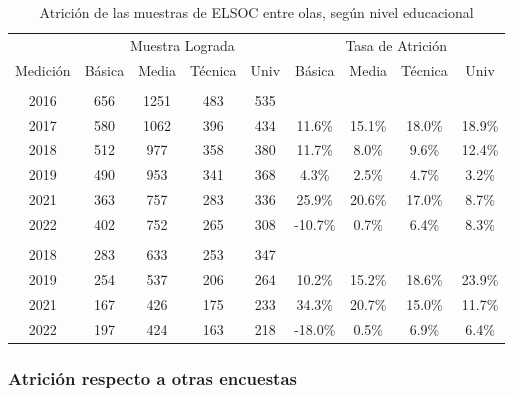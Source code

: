 \documentclass[
  12pt,
]{article}
\begin{document}
\begin{table}[H]

\caption{\label{tab:tabla-atricion-educ}Atrición de las muestras de ELSOC entre olas, según nivel educacional}
\centering
\begin{tabular}[t]{ccccccccc}
\toprule
\multicolumn{1}{c}{ } & \multicolumn{4}{c}{Muestra Lograda} & \multicolumn{4}{c}{Tasa de Atrición} \\
\cmidrule(l{3pt}r{3pt}){2-5} \cmidrule(l{3pt}r{3pt}){6-9}
Medición & Básica & Media & Técnica & Univ & Básica & Media & Técnica & Univ\\
\midrule
\addlinespace[0.3em]
\multicolumn{9}{l}{\textbf{Muestra Original}}\\
\hspace{1em}2016 & 656 & 1251 & 483 & 535 &  &  &  & \\
\hspace{1em}2017 & 580 & 1062 & 396 & 434 & 11.6\% & 15.1\% & 18.0\% & 18.9\%\\
\hspace{1em}2018 & 512 & 977 & 358 & 380 & 11.7\% & 8.0\% & 9.6\% & 12.4\%\\
\hspace{1em}2019 & 490 & 953 & 341 & 368 & 4.3\% & 2.5\% & 4.7\% & 3.2\%\\
\hspace{1em}2021 & 363 & 757 & 283 & 336 & 25.9\% & 20.6\% & 17.0\% & 8.7\%\\
\hspace{1em}2022 & 402 & 752 & 265 & 308 & -10.7\% & 0.7\% & 6.4\% & 8.3\%\\
\addlinespace[0.3em]
\multicolumn{9}{l}{\textbf{Muestra Refresco}}\\
\hspace{1em}2018 & 283 & 633 & 253 & 347 &  &  &  & \\
\hspace{1em}2019 & 254 & 537 & 206 & 264 & 10.2\% & 15.2\% & 18.6\% & 23.9\%\\
\hspace{1em}2021 & 167 & 426 & 175 & 233 & 34.3\% & 20.7\% & 15.0\% & 11.7\%\\
\hspace{1em}2022 & 197 & 424 & 163 & 218 & -18.0\% & 0.5\% & 6.9\% & 6.4\%\\
\bottomrule
\end{tabular}
\end{table}

\hypertarget{atriciuxf3n-respecto-a-otras-encuestas}{%
\subsubsection{Atrición respecto a otras encuestas}\label{atriciuxf3n-respecto-a-otras-encuestas}}
\end{document}
